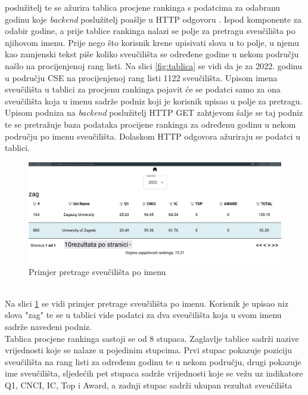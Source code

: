 \documentclass[times, utf8, zavrsni]{fer}
\begin{document}
poslužitelj te se ažurira tablica procjene rankinga s podatcima za odabranu godinu koje \emph{backend} poslužitelj poašlje u HTTP odgovoru .
\newpage Ispod komponente za odabir godine, a prije tablice rankinga
nalazi se polje za pretragu sveučilišta po njihovom imenu. Prije nego što korisnik krene upisivati slova u to polje, u njemu kao zamjenski tekst 
piše koliko sveučilišta se određene godine u nekom području našlo na procijenjenoj rang listi. Na slici \ref{fig:tablica} se vidi da je za 2022. godinu u području CSE 
na procijenjenoj rang listi 1122 sveučilišta.
Upisom imena sveučilišta u tablici za procjenu rankinga pojavit će se podatci samo za ona sveučilišta
koja u imenu sadrže podniz koji je korisnik upisao u polje za pretragu. Upisom podniza na \emph{backend} poslužitelj HTTP GET zahtjevom šalje se taj podniz te se 
pretražuje baza podataka procijene rankinga za određenu godinu u nekom području po imenu sveučilišta. Dolaskom HTTP odgovora ažuriraju se podatci u tablici.\\
\begin{figure}[htb]
    \hspace*{-2cm}  
       \includegraphics[scale=0.21]{search.png} 
       \caption{Primjer pretrage sveučilišta po imenu}
       \label{fig:search}
       \end{figure}
\\Na slici \ref{fig:search} se vidi primjer pretrage sveučilišta po imenu. Korisnik je upisao niz slova "zag" te se u tablici vide podatci za dva sveučilišta
koja u svom imenu sadrže navedeni podniz. 
\\Tablica procjene rankinga sastoji se od 8 stupaca. Zaglavlje tablice sadrži nazive vrijednosti koje se nalaze u pojedinim stupcima.
Prvi stupac pokazuje poziciju sveučilišta na rang listi za određenu godinu te u nekom području, drugi 
pokazuje ime sveučilišta, sljedećih pet stupaca sadrže vrijednosti koje se vežu uz indikatore Q1, CNCI, IC, Top i Award, a zadnji stupac sadrži ukupan rezultat sveučilišta 
\end{document}
